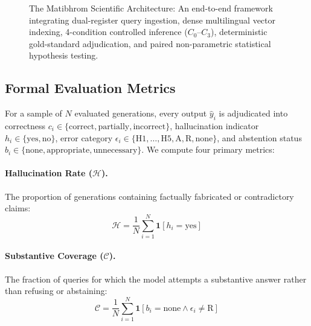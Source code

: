 \documentclass[11pt,a4paper,twocolumn]{article}
\begin{document}
\begin{figure}[t]
\caption{The Matibhrom Scientific Architecture: An end-to-end framework integrating dual-register query ingestion, dense multilingual vector indexing, 4-condition controlled inference ($C_0\text{--}C_3$), deterministic gold-standard adjudication, and paired non-parametric statistical hypothesis testing.}
\label{fig:methodology_framework}
\end{figure}

\subsection{Formal Evaluation Metrics}
For a sample of $N$ evaluated generations, every output $\hat{y}_i$ is adjudicated into correctness $c_i \in \{\text{correct}, \text{partially}, \text{incorrect}\}$, hallucination indicator $h_i \in \{\text{yes}, \text{no}\}$, error category $\epsilon_i \in \{\text{H1}, \dots, \text{H5}, \text{A}, \text{R}, \text{none}\}$, and abstention status $b_i \in \{\text{none}, \text{appropriate}, \text{unnecessary}\}$. We compute four primary metrics:

\paragraph{Hallucination Rate ($\mathcal{H}$).} The proportion of generations containing factually fabricated or contradictory claims:
\begin{equation}
    \mathcal{H} = \frac{1}{N} \sum_{i=1}^N \mathbf{1}[h_i = \text{yes}]
    \label{eq:hallucination_rate}
\end{equation}

\paragraph{Substantive Coverage ($\mathcal{C}$).} The fraction of queries for which the model attempts a substantive answer rather than refusing or abstaining:
\begin{equation}
    \mathcal{C} = \frac{1}{N} \sum_{i=1}^N \mathbf{1}[b_i = \text{none} \land \epsilon_i \neq \text{R}]
    \label{eq:coverage}
\end{equation}
\end{document}
